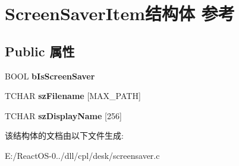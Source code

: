 \hypertarget{struct_screen_saver_item}{}\section{Screen\+Saver\+Item结构体 参考}
\label{struct_screen_saver_item}
\subsection*{Public 属性}
\begin{DoxyCompactItemize}
\item 
\mbox{\label{struct_screen_saver_item_a00b956cc8f9af8aa241512e202322dfb}} 
B\+O\+OL {\bfseries b\+Is\+Screen\+Saver}
\item 
\mbox{\label{struct_screen_saver_item_a6400fb7f7fc81bc4ebb5d8bd74beec05}} 
T\+C\+H\+AR {\bfseries sz\+Filename} \mbox{[}M\+A\+X\+\_\+\+P\+A\+TH\mbox{]}
\item 
\mbox{\label{struct_screen_saver_item_ae2a4d1a1bf465a60fec75fe15a49f073}} 
T\+C\+H\+AR {\bfseries sz\+Display\+Name} \mbox{[}256\mbox{]}
\end{DoxyCompactItemize}


该结构体的文档由以下文件生成\+:\begin{DoxyCompactItemize}
\item 
E\+:/\+React\+O\+S-\/0../dll/cpl/desk/screensaver.\+c\end{DoxyCompactItemize}
